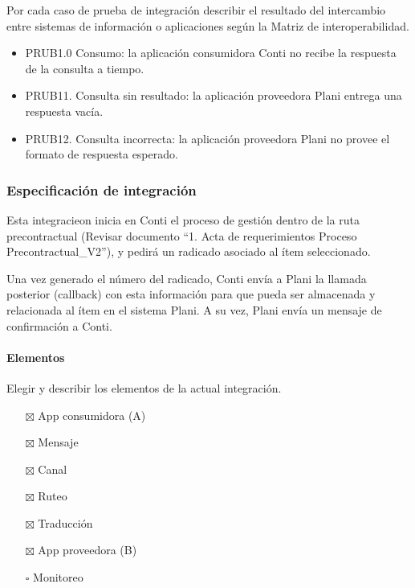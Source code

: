 \documentclass[
  paper=a4,
  ,captions=tableheading
]{scrartcl}
\providecommand{\tightlist}{%
  \setlength{\itemsep}{0pt}\setlength{\parskip}{0pt}}
\begin{document}
Por cada caso de prueba de integración describir el resultado del
intercambio entre sistemas de información o aplicaciones según la Matriz
de interoperabilidad.

\begin{itemize}
\tightlist
\item
  PRUB1.0 Consumo: la aplicación consumidora Conti no recibe la
  respuesta de la consulta a tiempo.
\item
  PRUB11. Consulta sin resultado: la aplicación proveedora Plani entrega
  una respuesta vacía.
\item
  PRUB12. Consulta incorrecta: la aplicación proveedora Plani no provee
  el formato de respuesta esperado.
\end{itemize}

\subsubsection{Especificación de
integración}\label{sec:especificaciuxf3n-de-integraciuxf3n-2}

Esta integracieon inicia en Conti el proceso de gestión dentro de la
ruta precontractual (Revisar documento ``1. Acta de requerimientos
Proceso Precontractual\_V2''), y pedirá un radicado asociado al ítem
seleccionado.

Una vez generado el número del radicado, Conti envía a Plani la llamada
posterior (callback) con esta información para que pueda ser almacenada
y relacionada al ítem en el sistema Plani. A su vez, Plani envía un
mensaje de confirmación a Conti.

\paragraph{Elementos}\label{sec:elementos-2}

Elegir y describir los elementos de la actual integración.

\begin{itemize}
\tightlist
\item[$\boxtimes$]
  App consumidora (A)
\item[$\boxtimes$]
  Mensaje
\item[$\boxtimes$]
  Canal
\item[$\boxtimes$]
  Ruteo
\item[$\boxtimes$]
  Traducción
\item[$\boxtimes$]
  App proveedora (B)
\item[$\square$]
  Monitoreo
\end{itemize}
\end{document}
